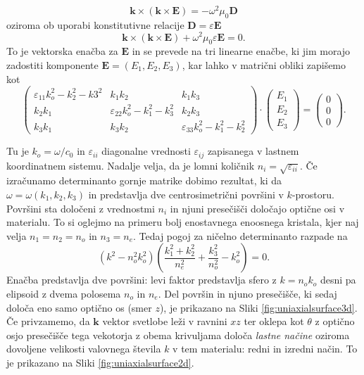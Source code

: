 \documentclass[longbibliography,slovene,a4paper,12pt]{book}
\begin{document}
\begin{equation}
\mathbf{k} \times (\mathbf{k} \times \mathbf{E}) = -\omega^2 \mu_0 \mathbf{D}
\end{equation}
oziroma ob uporabi konstitutivne relacije $\mathbf{D} = \varepsilon \mathbf{E}$ 
\begin{equation}
\mathbf{k} \times (\mathbf{k} \times \mathbf{E}) + \omega^2 \mu_0 \varepsilon \mathbf{E} = 0.
\end{equation}
To je vektorska enačba za $\mathbf{E}$ in se prevede na tri linearne enačbe, ki jim morajo zadostiti komponente $\mathbf{E} = (E_1,E_2,E_3)$, kar lahko v matrični obliki zapišemo kot
\begin{equation}
\begin{pmatrix} \varepsilon_{11}k_o^2-k_2^2-k3^2 & k_1k_2 & k_1k_3 \\
				k_2k_1 &  \varepsilon_{22}k_o^2-k_1^2-k_3^2 & k_2k_3\\
				k_3k_1 & k_3k_2 &  \varepsilon_{33}k_o^2-k_1^2-k_2^2	
	   \end{pmatrix} \cdot \begin{pmatrix}E_1 \\ E_2 \\ E_3 \end{pmatrix}= \begin{pmatrix}0 \\ 0 \\ 0 \end{pmatrix}.
\label{uniaxialQ}
\end{equation}

Tu je $k_o = \omega/c_0$ in $\varepsilon_{ii}$ diagonalne vrednosti $\varepsilon_{ij}$ zapisanega v lastnem koordinatnem sistemu. Nadalje velja, da je lomni količnik $n_i = \sqrt{\varepsilon_{ii}}$. Če izračunamo determinanto gornje matrike dobimo rezultat, ki da $\omega = \omega(k_1,k_2,k_3)$ in predstavlja dve centrosimetrični površini v $k$-prostoru. Površini sta določeni z vrednostmi $n_i$ in njuni presečišči določajo optične osi v materialu. To si oglejmo na primeru bolj enostavnega enoosnega kristala, kjer naj velja $n_1=n_2=n_o$ in $n_3 = n_e$. Tedaj pogoj za ničelno determinanto razpade na
\begin{equation}
(k^2-n_o^2k_o^2)\left(\frac{k_1^2+k_2^2}{n_e^2} + \frac{k_3^2}{n_o^2} -k_o^2\right ) =0.
\end{equation}
Enačba predstavlja dve površini: levi faktor predstavlja sfero z $k=n_ok_o$ desni pa elipsoid z dvema polosema $n_o$ in $n_e$. Del površin in njuno presečišče, ki sedaj določa eno samo optično os (smer $z$), je prikazano na Sliki  \ref{fig:uniaxialsurface3d}. Če privzamemo, da $\mathbf{k}$ vektor svetlobe leži v ravnini $xz$ ter oklepa kot $\theta$ z optično osjo presečišče tega vekotorja z obema krivuljama določa \emph{lastne načine} oziroma dovoljene velikosti valovnega števila $k$ v tem materialu: redni in izredni način\cite{saleh}. To je prikazano na Sliki \ref{fig:uniaxialsurface2d}.
\end{document}
